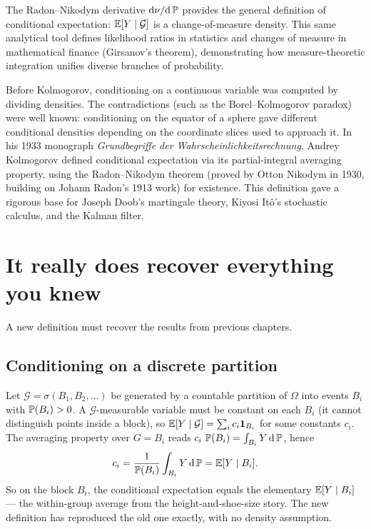 \begin{aestheticbox}
The Radon--Nikodym derivative $\dd\nu/\dd\P$ provides the general definition of
conditional expectation: $\E[Y\given\mathcal{G}]$ is a change-of-measure density.
This same analytical tool defines likelihood ratios in statistics and changes of
measure in mathematical finance (Girsanov's theorem), demonstrating how
measure-theoretic integration unifies diverse branches of probability.
\end{aestheticbox}

\begin{historybox}
Before Kolmogorov, conditioning on a continuous variable was computed by
dividing densities. The contradictions (such as the Borel--Kolmogorov paradox)
were well known: conditioning on the equator of a sphere gave different
conditional densities depending on the coordinate slices used to approach it.
In his 1933 monograph \emph{Grundbegriffe der Wahrscheinlichkeitsrechnung},
Andrey Kolmogorov defined conditional expectation via its partial-integral
averaging property, using the Radon--Nikodym theorem (proved by Otton Nikodym in
1930, building on Johann Radon's 1913 work) for existence. This definition
gave a rigorous base for Joseph Doob's martingale theory, Kiyosi It\^o's
stochastic calculus, and the Kalman filter.
\end{historybox}

\section{It really does recover everything you knew}
\label{ch38:recovers}

A new definition must recover the results from previous chapters.

\subsection{Conditioning on a discrete partition}
\label{ch38:discrete-recover}

Let $\mathcal{G} = \sigma(B_1, B_2, \dots)$ be generated by a countable partition of $\Omega$ into
events $B_i$ with $\P(B_i) > 0$. A $\mathcal{G}$-measurable variable must be constant on each $B_i$
(it cannot distinguish points inside a block), so $\E[Y\given\mathcal{G}] = \sum_i c_i \ind_{B_i}$
for some constants $c_i$. The averaging property over $G = B_i$ reads $c_i\,\P(B_i) = \int_{B_i}
Y\,\dd\P$, hence
\[
  c_i = \frac{1}{\P(B_i)} \int_{B_i} Y \,\dd\P = \E[Y \given B_i].
\]
So on the block $B_i$, the conditional expectation equals the elementary $\E[Y \given B_i]$ --- the
within-group average from the height-and-shoe-size story. The new definition has reproduced the old
one exactly, with no density assumption.

